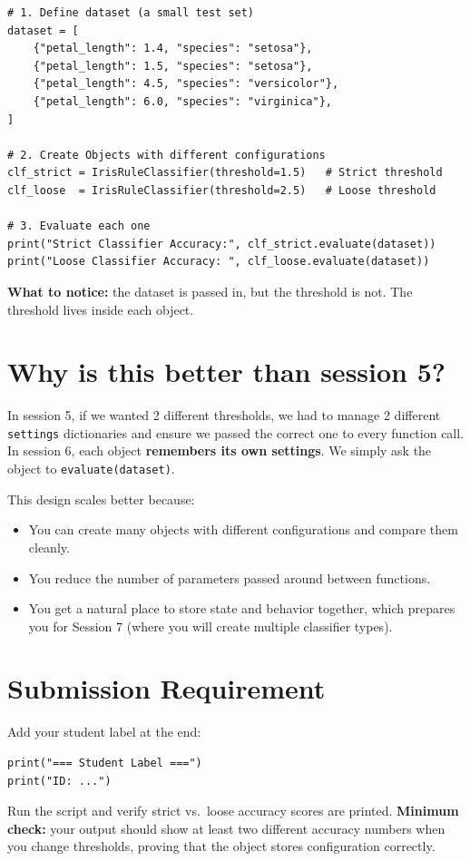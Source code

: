 \begin{verbatim}
# 1. Define dataset (a small test set)
dataset = [
    {"petal_length": 1.4, "species": "setosa"},
    {"petal_length": 1.5, "species": "setosa"},
    {"petal_length": 4.5, "species": "versicolor"},
    {"petal_length": 6.0, "species": "virginica"},
]

# 2. Create Objects with different configurations
clf_strict = IrisRuleClassifier(threshold=1.5)   # Strict threshold
clf_loose  = IrisRuleClassifier(threshold=2.5)   # Loose threshold

# 3. Evaluate each one
print("Strict Classifier Accuracy:", clf_strict.evaluate(dataset))
print("Loose Classifier Accuracy: ", clf_loose.evaluate(dataset))
\end{verbatim}
\noindent
\textbf{What to notice:} the dataset is passed in, but the threshold is not.
The threshold lives inside each object.

\section{Why is this better than session 5?}
In session 5, if we wanted 2 different thresholds, we had to manage 2 different \texttt{settings} dictionaries and ensure we passed the correct one to every function call.
In session 6, each object \textbf{remembers its own settings}.
We simply ask the object to \texttt{evaluate(dataset)}.

\noindent
This design scales better because:
\begin{itemize}\setlength{\itemsep}{2pt}
    \item You can create many objects with different configurations and compare them cleanly.
    \item You reduce the number of parameters passed around between functions.
    \item You get a natural place to store state and behavior together, which prepares you for Session 7 (where you will create multiple classifier types).
\end{itemize}

\section{Submission Requirement}
Add your student label at the end:
\begin{verbatim}
print("=== Student Label ===")
print("ID: ...")
\end{verbatim}
Run the script and verify strict vs.\ loose accuracy scores are printed.
\noindent
\textbf{Minimum check:} your output should show at least two different accuracy numbers when you change thresholds, proving that the object stores configuration correctly.

